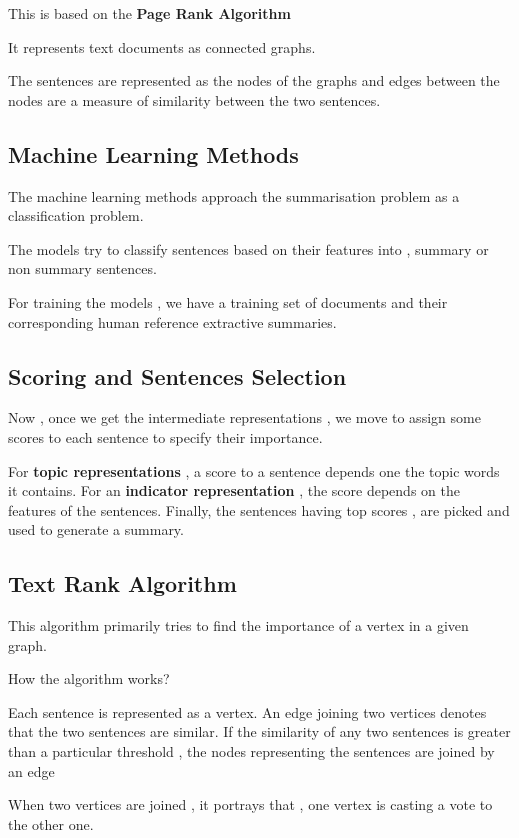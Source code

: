 \documentclass{article}
\begin{document}
This is based on the \textbf{Page Rank Algorithm}

It represents text documents as connected graphs.

The sentences are represented as the nodes of the graphs and edges between the nodes are a measure of similarity between the two sentences.

\subsection{Machine Learning Methods}

The machine learning methods approach the summarisation problem as a classification problem.

The models try to classify sentences based on their features into , summary or non summary sentences.

For training the models , we have a training set of documents and their corresponding human reference extractive summaries.

\subsection{Scoring and Sentences Selection}

Now , once we get the intermediate representations , we move to assign some scores to each sentence to specify their importance.

For \textbf{topic representations} , a score to a sentence depends one the topic words it contains.
For an \textbf{indicator representation} , the score depends on the features of the sentences.
Finally, the sentences having top scores , are picked and used to generate a summary.

\subsection{Text Rank Algorithm}

This algorithm primarily tries to find the importance of a vertex in a given graph.

How the algorithm works?

Each sentence is represented as a vertex. An edge joining two vertices denotes that the two sentences are similar. If the similarity of any two sentences is greater than a particular threshold , the nodes representing the sentences are joined by an edge

When two vertices are joined , it portrays that , one vertex is casting a vote to the other one.
\end{document}
